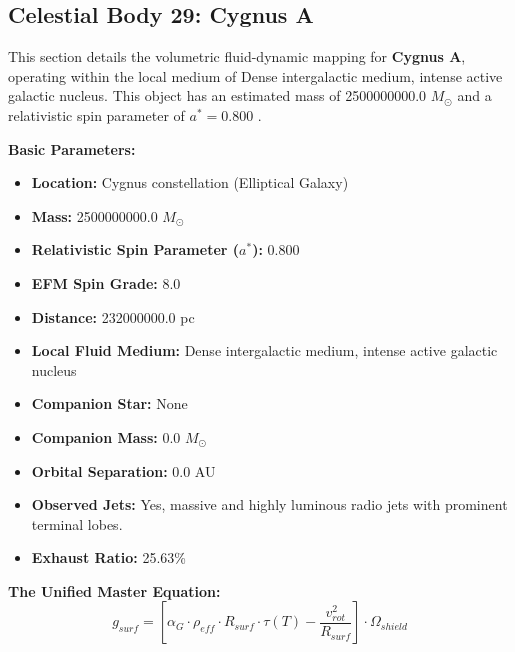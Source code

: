 \documentclass[11pt, a4paper]{article}
\begin{document}
\clearpage
\subsection{Celestial Body 29: Cygnus A}
This section details the volumetric fluid-dynamic mapping for \textbf{Cygnus A}, operating within the local medium of Dense intergalactic medium, intense active galactic nucleus. This object has an estimated mass of 2500000000.0 $M_{\odot}$ and a relativistic spin parameter of $a^* = 0.800$ \cite{tadhunter2003, ned}.

\vspace{0.5em}
\noindent \textbf{Basic Parameters:}
\begin{itemize}
  \item \textbf{Location:} Cygnus constellation (Elliptical Galaxy)
  \item \textbf{Mass:} 2500000000.0 $M_{\odot}$
  \item \textbf{Relativistic Spin Parameter ($a^*$):} 0.800
  \item \textbf{EFM Spin Grade:} 8.0
  \item \textbf{Distance:} 232000000.0 pc
  \item \textbf{Local Fluid Medium:} Dense intergalactic medium, intense active galactic nucleus
  \item \textbf{Companion Star:} None
  \item \textbf{Companion Mass:} 0.0 $M_{\odot}$
  \item \textbf{Orbital Separation:} 0.0 AU
  \item \textbf{Observed Jets:} Yes, massive and highly luminous radio jets with prominent terminal lobes.
  \item \textbf{Exhaust Ratio:} 25.63\%
\end{itemize}

\vspace{0.5em}
\noindent \textbf{The Unified Master Equation:}
$$ g_{surf} = \left[ \alpha_G \cdot \rho_{eff} \cdot R_{surf} \cdot \tau(T) - \frac{v_{rot}^2}{R_{surf}} \right] \cdot \Omega_{shield} $$
\end{document}
